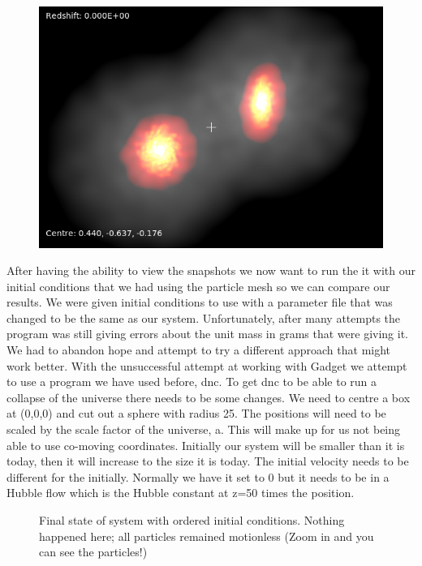 \documentclass[10pt]{article}
\begin{document}
\begin{figure}[h]
\includegraphics[width=4.5in]{gadget.png}
\centering
\end{figure}


	After having the ability to view the snapshots we now want to run the it with our initial conditions that we had using the particle mesh so we can compare our results. We were given initial conditions to use with a parameter file that was changed to be the same as our system. Unfortunately, after many attempts the program was still giving errors about the unit mass in grams that were giving it. We had to abandon hope and attempt to try a different approach that might work better. With the unsuccessful attempt at working with Gadget we attempt to use a program we have used before, dnc. 
	To get dnc to be able to run a collapse of the universe there needs to be some changes. We need to centre a box at (0,0,0) and cut out a sphere with radius 25.  The positions will need to be scaled by the scale factor of the universe, a. This will make up for us not being able to use co-moving coordinates. Initially our system will be smaller than it is today, then it will increase to the size it is today. The initial velocity needs to be different for the initially. Normally we have it set to 0 but it needs to be in a Hubble flow which is the Hubble constant at z=50 times the position. 



\begin{figure}[htbp]
\centering

\caption{Final state of system with ordered initial conditions. Nothing happened here; all particles remained motionless (Zoom in and you can see the particles!)}
\label{fig:order}
\end{figure}
\end{document}
